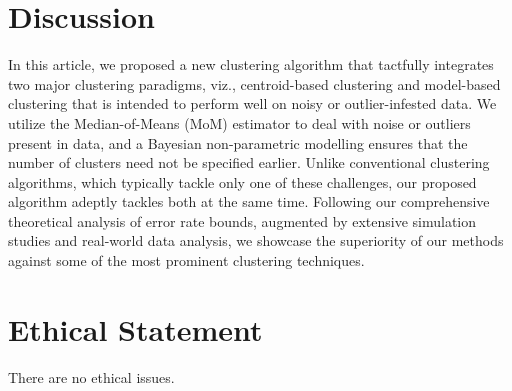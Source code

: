 \documentclass{article}
\begin{document}
\section{Discussion}

In this article, we proposed a new clustering algorithm that tactfully integrates two major clustering paradigms, viz., centroid-based clustering and model-based clustering that is intended to perform  well on noisy or outlier-infested data. We utilize the Median-of-Means (MoM) estimator to deal with noise or outliers present in data, and a Bayesian non-parametric modelling ensures that the number of clusters need not be specified earlier. Unlike conventional clustering algorithms, which typically tackle only one of these challenges, our proposed algorithm adeptly tackles both at the same time. Following our comprehensive theoretical analysis of error rate bounds, augmented by extensive simulation studies and real-world data analysis, we showcase the superiority of our methods against some of the most prominent clustering techniques.




\appendix

\section*{Ethical Statement}

There are no ethical issues.






\end{document}
